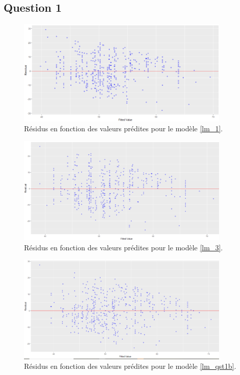 \documentclass{article}
\begin{document}
\subsection{Question 1}

\begin{figure}[H]  %
	\centering
	\includegraphics[width=0.9\textwidth]{graphiques/residus_VS_predicitions_lm1}
	\caption{Résidus en fonction des valeurs prédites pour le modèle \eqref{lm_1}.}
	\label{residus_VS_predicitions_lm1}
\end{figure}

\begin{figure}[H]  %
	\centering
	\includegraphics[width=0.9\textwidth]{graphiques/residus_VS_predicitions_lm2}
	\caption{Résidus en fonction des valeurs prédites pour le modèle \eqref{lm_3}.}
	\label{residus_VS_predicitions_lm3}
\end{figure}

\begin{figure}[H]  %
	\centering
\includegraphics[width=0.9\textwidth]{graphiques/residus_VS_predicitions_lm_Qst1b}
\caption{Résidus en fonction des valeurs prédites pour le modèle \eqref{lm_qst1b}.}
\label{residus_VS_predicitions_lm_Qst1b}
\end{figure}
\end{document}
